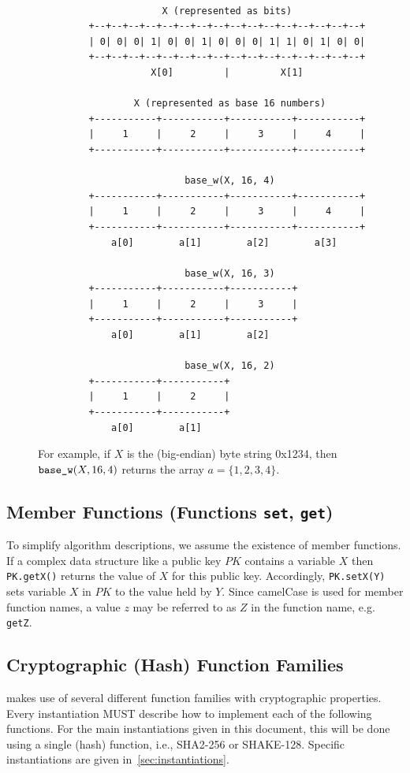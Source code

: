 \begin{figure}[h]
\caption{For example, if $X$ is the (big-endian) byte string 0x1234, then
   $\texttt{base\_w}(X, 16, 4)$ returns the array $a = \{1, 2, 3, 4\}$.}
\begin{verbatim}

                      X (represented as bits)
         +--+--+--+--+--+--+--+--+--+--+--+--+--+--+--+--+
         | 0| 0| 0| 1| 0| 0| 1| 0| 0| 0| 1| 1| 0| 1| 0| 0|
         +--+--+--+--+--+--+--+--+--+--+--+--+--+--+--+--+
                    X[0]         |         X[1]

                 X (represented as base 16 numbers)
         +-----------+-----------+-----------+-----------+
         |     1     |     2     |     3     |     4     |
         +-----------+-----------+-----------+-----------+

                          base_w(X, 16, 4)
         +-----------+-----------+-----------+-----------+
         |     1     |     2     |     3     |     4     |
         +-----------+-----------+-----------+-----------+
             a[0]        a[1]        a[2]        a[3]

                          base_w(X, 16, 3)
         +-----------+-----------+-----------+
         |     1     |     2     |     3     |
         +-----------+-----------+-----------+
             a[0]        a[1]        a[2]

                          base_w(X, 16, 2)
         +-----------+-----------+
         |     1     |     2     |
         +-----------+-----------+
             a[0]        a[1]
\end{verbatim}
\label{example:basew}
\end{figure}

\subsection{Member Functions (Functions \texttt{set}, \texttt{get})}\label{func:member}

   To simplify algorithm descriptions, we assume the existence of member
   functions.  If a complex data structure like a public key $PK$ contains
   a variable $X$ then \texttt{PK.getX()} returns the value of $X$ for this public key.
   Accordingly, \texttt{PK.setX(Y)} sets variable $X$ in $PK$ to the value held by
   $Y$.  Since camelCase is used for member function names, a value $z$ may
   be referred to as $Z$ in the function name, e.g.  \texttt{getZ}.

\subsection{Cryptographic (Hash) Function Families}
   \spx makes use of several different function families with cryptographic
   properties. Every \spx instantiation MUST describe how to implement each of
   the following functions. For the main instantiations given in this document,
   this will be done using a single (hash) function, i.e., SHA2-256 or SHAKE-128.
   Specific instantiations are given in~\autoref{sec:instantiations}.

